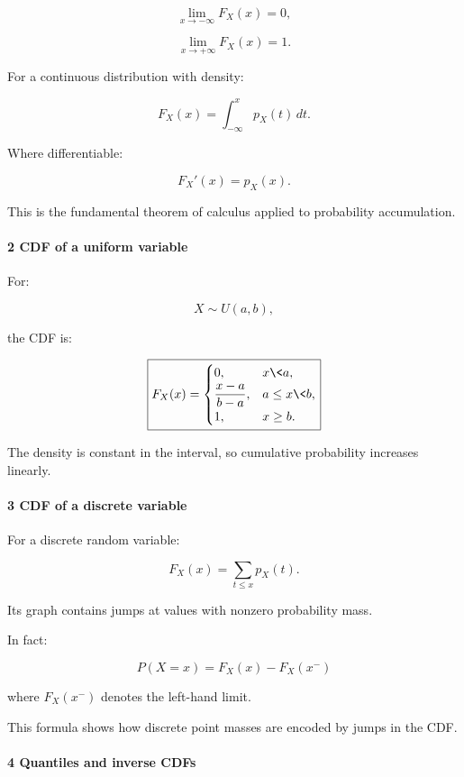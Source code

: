 \[
 \lim_{x\to-\infty}F_X(x)=0,
\]

\[
 \lim_{x\to+\infty}F_X(x)=1.
\]

For a continuous distribution with density:

\[
 \boxed{ F_X(x)=\int_{-\infty}^{x}p_X(t)\,dt }.
\]

Where differentiable:

\[
 \boxed{ F_X'(x)=p_X(x) }.
\]

This is the fundamental theorem of calculus applied to probability accumulation.

\paragraph{2 CDF of a uniform variable}\label{cdf-of-a-uniform-variable}

For:

\[
 X\sim U(a,b),
\]

the CDF is:

\[
 \boxed{ F_X(x)= \begin{cases} 0,&x\<a,\\ \dfrac{x-a}{b-a},&a\le x\<b,\\ 1,&x\ge b. \end{cases} }
\]

The density is constant in the interval, so cumulative probability increases linearly.

\paragraph{3 CDF of a discrete variable}\label{cdf-of-a-discrete-variable}

For a discrete random variable:

\[
 F_X(x)= \sum_{t\le x}p_X(t).
\]

Its graph contains jumps at values with nonzero probability mass.

In fact:

\[
 \boxed{ P(X=x) = F_X(x)-F_X(x^-) }
\]

where \(F_X(x^-)\) denotes the left-hand limit.

This formula shows how discrete point masses are encoded by jumps in the CDF.

\paragraph{4 Quantiles and inverse CDFs}\label{quantiles-and-inverse-cdfs}

